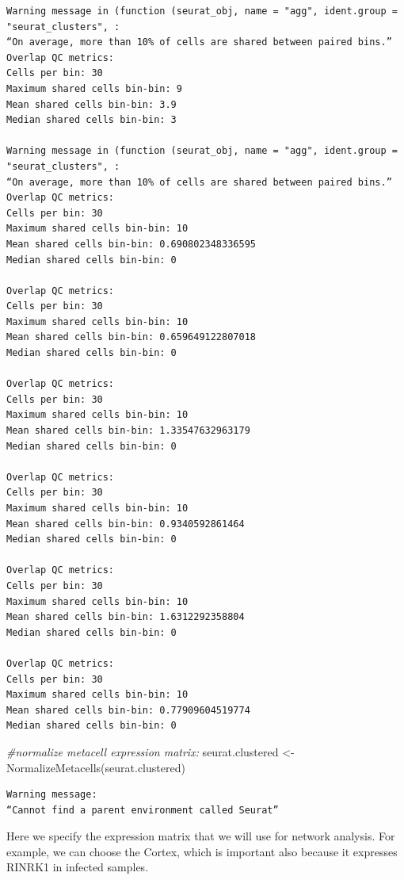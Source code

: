 \documentclass[
  letterpaper,
  DIV=11,
  numbers=noendperiod]{scrartcl}
\newenvironment{Shaded}{\begin{snugshade}}{\end{snugshade}}
\newcommand{\CommentTok}[1]{\textcolor[rgb]{0.38,0.63,0.69}{\textit{#1}}}
\newcommand{\FunctionTok}[1]{\textcolor[rgb]{0.02,0.16,0.49}{#1}}
\newcommand{\NormalTok}[1]{\textcolor[rgb]{0.00,0.44,0.13}{#1}}
\newcommand{\OtherTok}[1]{\textcolor[rgb]{0.00,0.44,0.13}{#1}}
\begin{document}
\begin{verbatim}
Warning message in (function (seurat_obj, name = "agg", ident.group = "seurat_clusters", :
“On average, more than 10% of cells are shared between paired bins.”
Overlap QC metrics:
Cells per bin: 30
Maximum shared cells bin-bin: 9
Mean shared cells bin-bin: 3.9
Median shared cells bin-bin: 3

Warning message in (function (seurat_obj, name = "agg", ident.group = "seurat_clusters", :
“On average, more than 10% of cells are shared between paired bins.”
Overlap QC metrics:
Cells per bin: 30
Maximum shared cells bin-bin: 10
Mean shared cells bin-bin: 0.690802348336595
Median shared cells bin-bin: 0

Overlap QC metrics:
Cells per bin: 30
Maximum shared cells bin-bin: 10
Mean shared cells bin-bin: 0.659649122807018
Median shared cells bin-bin: 0

Overlap QC metrics:
Cells per bin: 30
Maximum shared cells bin-bin: 10
Mean shared cells bin-bin: 1.33547632963179
Median shared cells bin-bin: 0

Overlap QC metrics:
Cells per bin: 30
Maximum shared cells bin-bin: 10
Mean shared cells bin-bin: 0.9340592861464
Median shared cells bin-bin: 0

Overlap QC metrics:
Cells per bin: 30
Maximum shared cells bin-bin: 10
Mean shared cells bin-bin: 1.6312292358804
Median shared cells bin-bin: 0

Overlap QC metrics:
Cells per bin: 30
Maximum shared cells bin-bin: 10
Mean shared cells bin-bin: 0.77909604519774
Median shared cells bin-bin: 0
\end{verbatim}

\begin{Shaded}
\begin{Highlighting}[]
\CommentTok{\#normalize metacell expression matrix:}
\NormalTok{seurat.clustered }\OtherTok{\textless{}{-}} \FunctionTok{NormalizeMetacells}\NormalTok{(seurat.clustered)}
\end{Highlighting}
\end{Shaded}

\begin{verbatim}
Warning message:
“Cannot find a parent environment called Seurat”
\end{verbatim}

Here we specify the expression matrix that we will use for network
analysis. For example, we can choose the Cortex, which is important also
because it expresses RINRK1 in infected samples.
\end{document}
